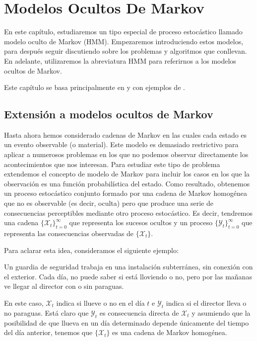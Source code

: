 \chapter{Modelos Ocultos De Markov}

En este capítulo, estudiaremos un tipo especial de proceso estocástico llamado modelo oculto de Markov (HMM). Empezaremos introduciendo estos modelos, para después seguir discutiendo sobre los problemas y algoritmos que conllevan. En adelante, utilizaremos la abreviatura HMM para referirnos a los modelos ocultos de Markov. 

Este capítulo se basa principalmente en \cite{Rabiner} y \cite[Capítulo 2]{Stamp} con ejemplos de \cite{Sevilla_2019} .

\section{Extensión a modelos ocultos de Markov}
Hasta ahora hemos considerado cadenas de Markov en las cuales cada estado es un evento observable (o material). Este modelo es demasiado restrictivo para aplicar a numerosos problemas en los que no podemos observar directamente los acontecimientos que nos interesan. Para estudiar este tipo de problema extendemos el concepto de modelo de Markov para incluir los casos en los que la observación es una función probabilística del estado. Como resultado, obtenemos un proceso estocástico conjunto formado por una cadena de Markov homogénea que no es observable (es decir, oculta) pero que produce una serie de consecuencias perceptibles mediante otro proceso estocástico. Es decir, tendremos una cadena $\{\mathcal{X}_t\}_{t=0}^{\infty}$ que representa los sucesos ocultos y un proceso $\{\mathcal{Y}_t\}_{t=0}^{\infty}$ que representa las consecuencias observadas de $\{\mathcal{X}_t\}$. 

Para aclarar esta idea, consideramos el siguiente ejemplo:

\begin{exampleth}\label{ejemplo_paraguas}
Un guardia de seguridad trabaja en una instalación subterránea, sin conexión con el exterior. Cada día, no puede saber si está lloviendo o no, pero por las mañanas ve llegar al director con o sin paraguas.

En este caso, $\mathcal{X}_t$ indica si llueve o no en el día $t$ e $\mathcal{Y}_t$ indica si el director lleva o no paraguas. Está claro que $\mathcal{Y}_t$ es consecuencia directa de $\mathcal{X}_t$ y asumiendo que la posibilidad de que llueva en un día determinado depende únicamente del tiempo del día anterior, tenemos que $\{\mathcal{X}_t\}$ es una cadena de Markov homogénea.

\end{exampleth}

